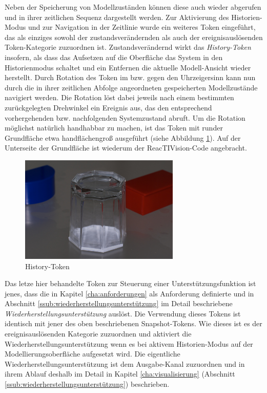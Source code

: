 Neben der Speicherung von Modellzuständen können diese auch wieder abgerufen und in ihrer zeitlichen Sequenz dargestellt werden. Zur Aktivierung des Historien-Modus und zur Navigation in der Zeitlinie wurde ein weiteres Token eingeführt, das als einziges sowohl der zustandsverändernden als auch der ereignisauslösenden Token-Kategorie zuzuordnen ist. Zustandsverändernd wirkt das \emph{History-Token} insofern, als dass das Aufsetzen auf die Oberfläche das System in den Historienmodus schaltet und ein Entfernen die aktuelle Modell-Ansicht wieder herstellt. Durch Rotation des Token im bzw. gegen den Uhrzeigersinn kann nun durch die in ihrer zeitlichen Abfolge angeordneten gespeicherten Modellzustände navigiert werden. Die Rotation löst dabei jeweils nach einem bestimmten zurückgelegten Drehwinkel ein Ereignis aus, das den entsprechend vorhergehenden bzw. nachfolgenden Systemzustand abruft. Um die Rotation möglichst natürlich handhabbar zu machen, ist das Token mit runder Grundfläche etwa handflächengroß ausgeführt (siehe Abbildung \ref{fig:img_SystemNeu_Historytoken}). Auf der Unterseite der Grundfläche ist wiederum der ReacTIVision-Code angebracht.

\begin{figure}[htbp]
	\centering
		\includegraphics[height=2in]{img/SystemNeu/Historytoken.jpg}
	\caption{History-Token}
	\label{fig:img_SystemNeu_Historytoken}
\end{figure}

Das letze hier behandelte Token zur Steuerung einer Unterstützungsfunktion ist jenes, dass die in Kapitel \ref{cha:anforderungen} als Anforderung definierte und in Abschnitt \ref{ssub:wiederherstellungsunterstützung} im Detail beschriebene \emph{Wiederherstellungsunterstützung} auslöst. Die Verwendung dieses Tokens ist identisch mit jener des oben beschriebenen Snapshot-Tokens. Wie dieses ist es der ereignisauslösenden Kategorie zuzuordnen und aktiviert die Wiederherstellungsunterstützung wenn es bei aktivem Historien-Modus auf der Modellierungsoberfläche aufgesetzt wird. Die eigentliche Wiederherstellungsunterstützung ist dem Ausgabe-Kanal zuzuordnen und in ihrem Ablauf deshalb im Detail in Kapitel \ref{cha:visualisierung} (Abschnitt \ref{ssub:wiederherstellungsunterstützung}) beschrieben.

